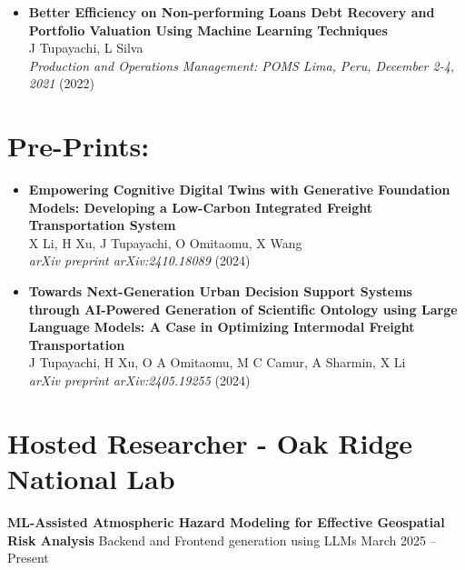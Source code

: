 \documentclass[10pt, letterpaper]{article}
\newenvironment{twocolentry}[2][]{
    \onecolentry
    \def\secondColumn{#2}
    \setcolumnwidth{\fill, 4.5 cm}
    \begin{paracol}{2}
}{
    \switchcolumn \raggedleft \secondColumn
    \end{paracol}
    \endonecolentry
} %
\begin{document}
\begin{itemize}[left=0pt]
        \item \textbf{Better Efficiency on Non-performing Loans Debt Recovery and Portfolio Valuation Using Machine Learning Techniques} \\
        J Tupayachi, L Silva \\
        \textit{Production and Operations Management: POMS Lima, Peru, December 2-4, 2021} (2022) \\
    
    

    \end{itemize}
    

    \section*{Pre-Prints:}

    \begin{itemize}[left=0pt] 

        \item \textbf{Empowering Cognitive Digital Twins with Generative Foundation Models: Developing a Low-Carbon Integrated Freight Transportation System} \\
        X Li, H Xu, J Tupayachi, O Omitaomu, X Wang \\
        \textit{arXiv preprint arXiv:2410.18089} (2024) \\



        \item \textbf{Towards Next-Generation Urban Decision Support Systems through AI-Powered Generation of Scientific Ontology using Large Language Models: A Case in Optimizing Intermodal Freight Transportation} \\
        J Tupayachi, H Xu, O A Omitaomu, M C Camur, A Sharmin, X Li \\
        \textit{arXiv preprint arXiv:2405.19255} (2024)

    \end{itemize}
    

    \section*{Hosted Researcher - Oak Ridge National Lab}
    \small

    \vspace{0.3cm} \begin{twocolentry}{March 2025 – Present} \textbf{ML-Assisted Atmospheric Hazard Modeling for Effective Geospatial Risk Analysis} \textbar Backend and Frontend generation using LLMs \end{twocolentry}
    
\end{document}
